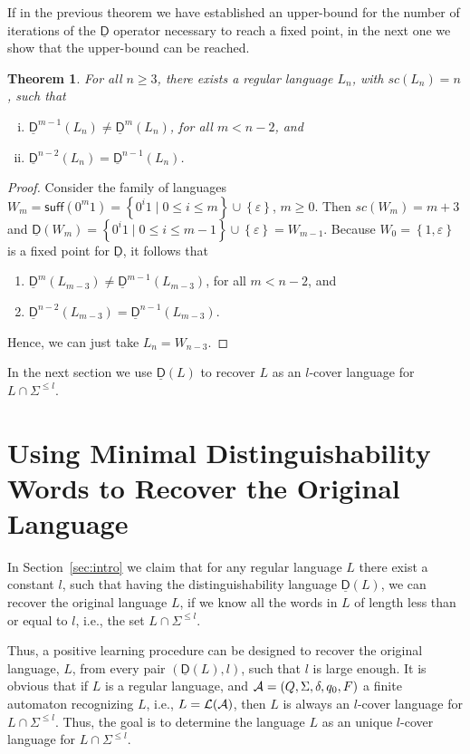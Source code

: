 \documentclass{article}
\newtheorem{theorem}{Theorem}
\newcommand{\suff}[1]{\mathsf{suff}(#1)}
\newcommand{\distmin}[1]{\underline{\mathsf{D}}(#1)}
\newcommand{\distmino}{\underline{\mathsf{D}}}
\newcommand{\distminp}[2]{\underline{\mathsf{D}}^{#2}{(#1)}}
\newcommand{\Set}[1]{\left\{ #1 \right\}}
\begin{document}
If in the previous theorem we have established an upper-bound for the number of iterations 
of the $\distmino$ operator necessary to reach a fixed point, in the next one we show that the 
upper-bound can be reached.
 
\begin{theorem}
\label{theo:fpdismint}
For all  $n \geq 3$, there exists a regular language $L_n$, 
with $sc(L_n)=n$, such that
\begin{enumerate}[i)]
 \item $\distminp{L_n}{m-1}\neq \distminp{L_n}{m}$, for all $m<n-2$, and 
 \item $\distminp{L_n}{n-2}=\distminp{L_n}{n-1}$.
\end{enumerate}
\end{theorem}

\begin{proof}
Consider the family of languages 
$W_m=\suff{0^m1}=\Set{0^i1\mid 0\leq i\leq m}\cup \Set{\varepsilon}$, $m\geq0$. 
Then $sc(W_m)=m+3$ and
$\distmin{W_m}=\Set{0^i1\mid 0\leq i\leq m-1}\cup\Set{\varepsilon}=W_{m-1}$.
Because $W_0=\Set{1,\varepsilon}$ is a fixed point for $\distmino$, it follows that
\begin{enumerate}
 \item $\distminp{L_{m-3}}{m}\neq \distminp{L_{m-3}}{m-1}$, for all $m<n-2$, and 
  \item $\distminp{L_{m-3}}{n-2}=\distminp{L_{m-3}}{n-1}$.
\end{enumerate}
Hence, we can just take $L_n=W_{n-3}$.
\end{proof}

In the next section we use $\distmin{L}$ to recover $L$ as an $l$-cover language for 
$L\cap\Sigma^{\leq l}$.

\section{Using Minimal Distinguishability Words  to Recover the Original \mbox{Language}}
\label{sec:recoverL}

In Section~\ref{sec:intro}  we claim that for any regular language $L$ there exist a constant $l$, such that 
having the distinguishability language $\distmin{L}$,
we can recover the original language $L$, if we know all the words in $L$ of length less than or equal to $l$, i.e., 
the set $L\cap \Sigma ^{\leq l}$.

Thus, a positive learning procedure can be designed to recover
 the original language, $L$,
from every pair $(\distmin{L},l)$, such that $l$ is large enough.
It is obvious that if $L$ is a regular language, and ${\cal A}=(Q,\Sigma,\delta,q_0,F)$ 
a finite automaton recognizing $L$, i.e., $L=\mathcal{L}({\cal A})$, then $L$ is always 
an $l$-cover language for $L\cap \Sigma^{\leq l}$.
Thus, the goal is to determine the language $L$ as an unique $l$-cover language
for $L\cap \Sigma^{\leq l}$.
\end{document}

